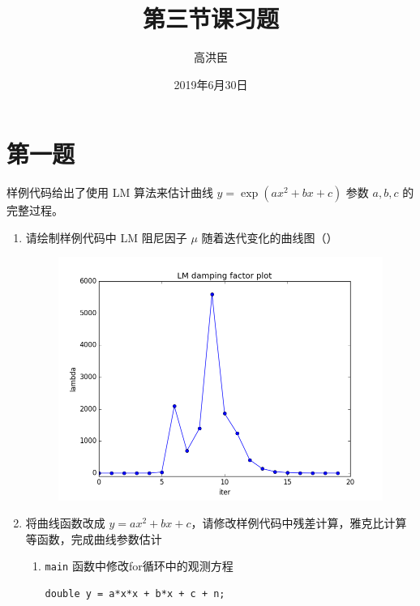\documentclass[12pt,a4paper,utf8]{article}
\title{第三节课习题}
\author{高洪臣}
\date{2019年6月30日}
\begin{document}
\maketitle

\noindent
\setlength{\parindent}{2em}
\setlength{\parskip}{0.3em}
\linespread{1}

\section*{第一题}

样例代码给出了使用 LM 算法来估计曲线 $y = \exp(a x^2 + bx + c)$ 参数 $a, b, c$ 的完整过程。

\begin{enumerate}

\item 请绘制样例代码中 LM 阻尼因子 $\mu$ 随着迭代变化的曲线图（{\color{red}{二次修改}}）

\begin{figure}[htbp] 
	\centering
	\includegraphics[width=12cm]{lm_damping_factor_new.png}
\end{figure} 

\item 将曲线函数改成 $y = a x^2 + bx + c$，请修改样例代码中残差计算，雅克比计算等函数，完成曲线参数估计

\begin{enumerate}
	\item \verb|main| 函数中修改for循环中的观测方程
	
	\begin{lstlisting}[frame=shadowbox]
	double y = a*x*x + b*x + c + n;
	\end{lstlisting}
	

\end{enumerate}
\end{enumerate}
\end{document}
